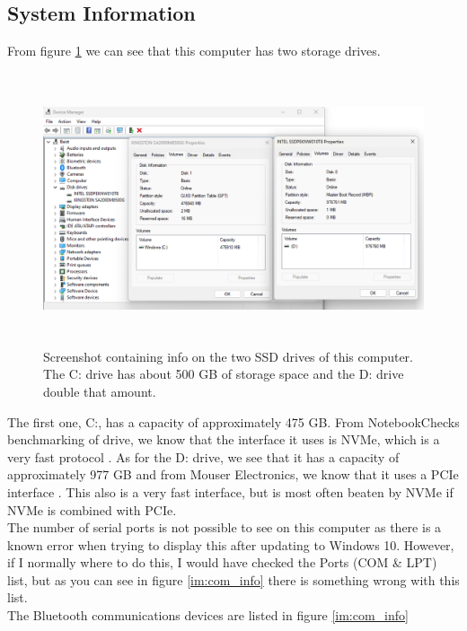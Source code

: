 \documentclass[11pt, A4paper, english]{article}
\begin{document}
		\subsection{System Information}
From figure \ref{im:ssd_info} we can see that this computer has two storage drives.
			\begin{figure}
\includegraphics[width=12.6cm, height=8cm]{SSD_info.png}
\caption{Screenshot containing info on the two SSD drives of this computer. The C: drive has about 500 GB of storage space and the D: drive double that amount.}
\label{im:ssd_info}	
			\end{figure}
The first one, C:, has a capacity of approximately 475 GB. From NotebookChecks benchmarking of drive, we know that the interface it uses is NVMe, which is a very fast protocol \cite{Kingston}. As for the D: drive, we see that it has a capacity of approximately 977 GB and from Mouser Electronics, we know that it uses a PCIe interface \cite{Intel}. This also is a very fast interface, but is most often beaten by NVMe if NVMe is combined with PCIe. \\
The number of serial ports is not possible to see on this computer as there is a known error when trying to display this after updating to Windows 10. However, if I normally where to do this, I would have checked the Ports (COM \& LPT) list, but as you can see in figure \ref{im:com_info} there is something wrong with this list. \\ 
The Bluetooth communications devices are listed in figure \ref{im:com_info}
\end{document}
